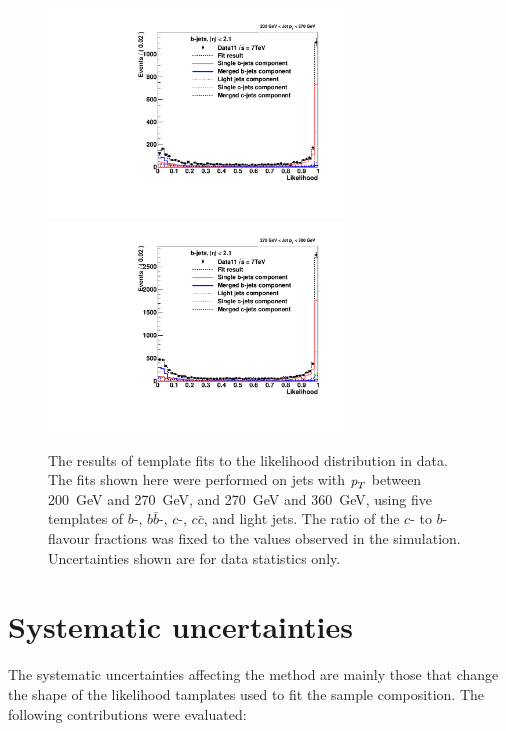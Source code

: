 \begin{figure}[tp]
\centering
\includegraphics[width=0.7\textwidth]{FIGS/Fits/LikelihoodFit_3param_ETAFull_Bin5.pdf}
\includegraphics[width=0.7\textwidth]{FIGS/Fits/LikelihoodFit_3param_ETAFull_Bin6.pdf}
\caption{The results of template fits to the likelihood distribution in data. The fits shown here were performed on jets with ${\emph{p}_{T}}$ between  200~GeV and 270~GeV, and 270~GeV and 360~GeV, using five templates of $b$-, $b\bar{b}$-, $c$-, $c\bar{c}$, and light jets.  The ratio of the $c$- to $b$-flavour fractions was fixed to the values observed in the simulation.  Uncertainties shown are for data statistics only.}
\label{fig:fittemplates2}
\end{figure}


\section{Systematic uncertainties}\label{sec:FractionSystematics}

The systematic uncertainties affecting the method are mainly those that change the shape of the likelihood tamplates used to fit the sample composition. The following contributions were evaluated:

